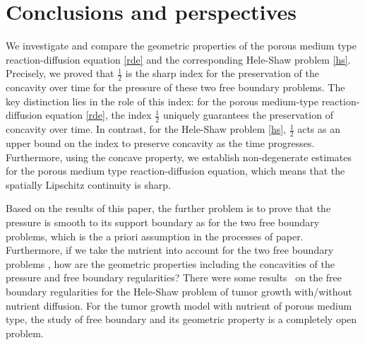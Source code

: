 \documentclass[10pt]{article}         %
\numberwithin{equation}{section}
\begin{document}
\section{Conclusions and perspectives}\label{cp} We investigate and compare the geometric properties of the porous medium type reaction-diffusion equation \eqref{rde} and the corresponding Hele-Shaw problem \eqref{hs}. Precisely, we proved that $\frac{1}{2}$ is the sharp index for the preservation of the concavity over time for the pressure of these two free boundary problems. The key distinction lies in the role of this index: for the porous medium-type reaction-diffusion equation \eqref{rde}, the index $\frac{1}{2}$ uniquely guarantees the preservation of concavity over time. In contrast, for the Hele-Shaw problem \eqref{hs}, $\frac{1}{2}$ acts as an upper bound on the index to preserve concavity as the time progresses. Furthermore, using the concave property, we establish non-degenerate estimates for the porous medium type reaction-diffusion equation, which means that the spatially Lipschitz continuity is sharp. 

\vspace{2mm}

Based on the results of this paper, the further problem is to prove that the pressure is smooth to its support boundary as \cite{DHL2001,DL2004} for the two free boundary problems, which is the a priori assumption in the processes of paper. Furthermore, if we take the nutrient into account for the two free boundary problems \cite{PERTHAME2014}, how are the geometric properties including the concavities of the pressure and free boundary regularities? There were some results~\cite{JKT2023,KL2023,CJK2023} on the free boundary regularities for the Hele-Shaw problem of tumor growth with/without nutrient diffusion. For the tumor growth model with nutrient of porous medium type, the study of free boundary and its geometric property is a completely open problem. 
\appendix
\end{document}
